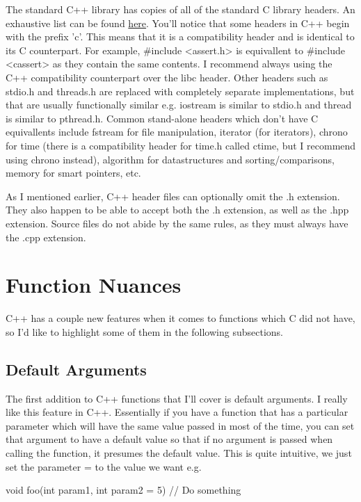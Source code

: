 \documentclass{article}
\begin{document}
The standard C++ library has copies of all of the standard C library headers. An exhaustive list can be found
\href{https://en.cppreference.com/w/cpp/header}{here}. You'll notice that some headers in C++ begin with the
prefix 'c'. This means that it is a compatibility header and is identical to its C counterpart. For example,
\#include <assert.h> is equivallent to \#include <cassert> as they contain the same contents. I recommend
always using the C++ compatibility counterpart over the libc header. Other headers such as stdio.h and
threads.h are replaced with completely separate implementations, but that are usually functionally similar e.g.
iostream is similar to stdio.h and thread is similar to pthread.h. Common stand-alone headers which don't have
C equivallents include fstream for file manipulation, iterator (for iterators), chrono for time (there is a
compatibility header for time.h called ctime, but I recommend using chrono instead), algorithm for
datastructures and sorting/comparisons, memory for smart pointers, etc.

As I mentioned earlier, C++ header files can optionally omit the .h extension. They also happen to be able to
accept both the .h extension, as well as the .hpp extension. Source files do not abide by the same rules, as
they must always have the .cpp extension.

\section{Function Nuances}

C++ has a couple new features when it comes to functions which C did not have, so I'd like to highlight some
of them in the following subsections.

\subsection{Default Arguments}

The first addition to C++ functions that I'll cover is default arguments. I really like this feature in C++.
Essentially if you have a function that has a particular parameter which will have the same value passed in
most of the time, you can set that argument to have a default value so that if no argument is passed when
calling the function, it presumes the default value. This is quite intuitive, we just set the parameter = to
the value we want e.g.

\begin{cpplst}
void foo(int param1, int param2 = 5)
{
    // Do something
}
\end{cpplst}
\end{document}
